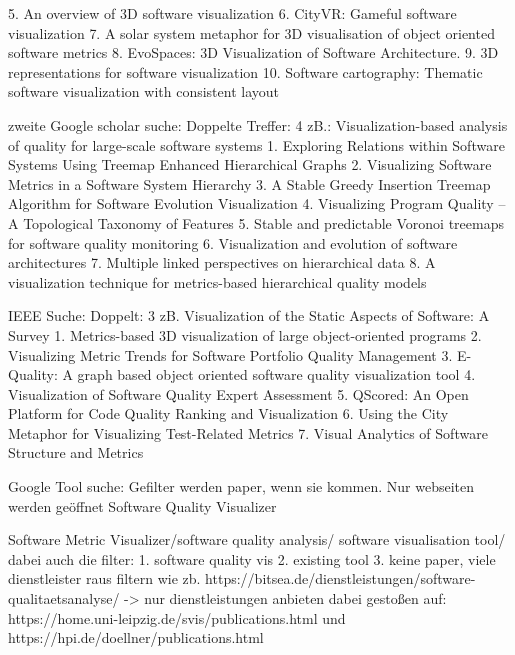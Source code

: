 5. An overview of 3D software visualization \cite{overview3D}
6. CityVR: Gameful software visualization \cite{cityVR}
7. A solar system metaphor for 3D visualisation of object oriented software metrics \cite{solarSystem}
8. EvoSpaces: 3D Visualization of Software Architecture. \cite{EvoSpaces}
9. 3D representations for software visualization \cite{3dsoftwareMarcus}
10. Software cartography: Thematic software visualization with consistent layout \cite{softwareCartography}


zweite Google scholar suche:
Doppelte Treffer: 4 zB.: Visualization-based analysis of quality for large-scale software systems \cite{visbasedlarge}
1. Exploring Relations within Software Systems Using Treemap Enhanced Hierarchical Graphs \cite{exploringRelations}
2. Visualizing Software Metrics in a Software System Hierarchy \cite{visSoftwareMetricsBook}
3. A Stable Greedy Insertion Treemap Algorithm for Software Evolution Visualization \cite{stableGreedyInsertion}
4. Visualizing Program Quality – A Topological Taxonomy of Features  \cite{visualizingProgramQuality}
5. Stable and predictable Voronoi treemaps for software quality monitoring \cite{stablePredictableVoronoi}
6. Visualization and evolution of software architectures \cite{visualizationEvolution}
7. Multiple linked perspectives on hierarchical data \cite{multipleLinkedPerspectives}
8. A visualization technique for metrics-based hierarchical quality models \cite{visualizationTechnique}

IEEE Suche:
Doppelt: 3 zB. Visualization of the Static Aspects of Software: A Survey \cite{staticSurvey}
1. Metrics-based 3D visualization of large object-oriented programs \cite{metricsBased3DVisualization}
2. Visualizing Metric Trends for Software Portfolio Quality Management \cite{visualizingMetricTrends}
3. E-Quality: A graph based object oriented software quality visualization tool \cite{eQuality}
4. Visualization of Software Quality Expert Assessment \cite{visSoftQualExpert}
5. QScored: An Open Platform for Code Quality Ranking and Visualization \cite{QScored}
6. Using the City Metaphor for Visualizing Test-Related Metrics \cite{citMetaphorTestMetrics}
7. Visual Analytics of Software Structure and Metrics \cite{visAnaSoftStructure}


Google Tool suche:
Gefilter werden paper, wenn sie kommen. Nur webseiten werden geöffnet
Software Quality Visualizer


Software Metric Visualizer/software quality analysis/ software visualisation tool/ 
dabei auch die filter: 1. software quality vis 2. existing tool 3. keine paper, 
viele dienstleister raus filtern wie zb. https://bitsea.de/dienstleistungen/software-qualitaetsanalyse/ -> nur dienstleistungen anbieten
dabei gestoßen auf: https://home.uni-leipzig.de/svis/publications.html und https://hpi.de/doellner/publications.html


